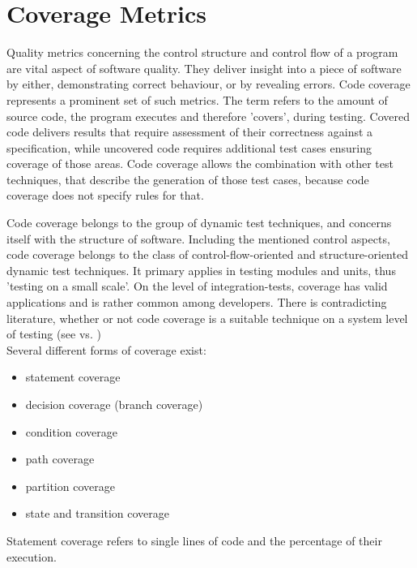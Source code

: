 	

	
	\section{Coverage Metrics}
	Quality metrics concerning the control structure and control flow of a program are vital aspect of software quality. They deliver insight into a piece of software by either, demonstrating correct behaviour, or by revealing errors. Code coverage represents a prominent set of such metrics. The term refers to the amount of source code, the program executes and therefore 'covers', during testing. Covered code delivers results that require assessment of their correctness against a specification, while uncovered code requires additional test cases ensuring coverage of those areas. Code coverage allows the combination with other test techniques, that describe the generation of those test cases, because code coverage does not specify rules for that.

	Code coverage belongs to the group of dynamic test techniques, and concerns itself with the structure of software. Including the mentioned control aspects, code coverage belongs to the class of control-flow-oriented and structure-oriented dynamic test techniques. It primary applies in testing modules and units, thus 'testing on a small scale'. On the level of integration-tests, coverage has valid applications and is rather common among developers. There is contradicting literature, whether or not code coverage is a suitable technique on a system level of testing (see \cite{Tian2005} vs. \cite{Liggesmeyer2002} ) \\
 	
	Several different forms of coverage exist:
	\begin{itemize} \setlength\itemsep{1px}
	\item statement coverage
	\item decision coverage (branch coverage)
	\item condition coverage
	\item path coverage
	\item partition coverage
	\item state and transition coverage
	\end{itemize}
	
	Statement coverage refers to single lines of code and the percentage of their execution.
	
